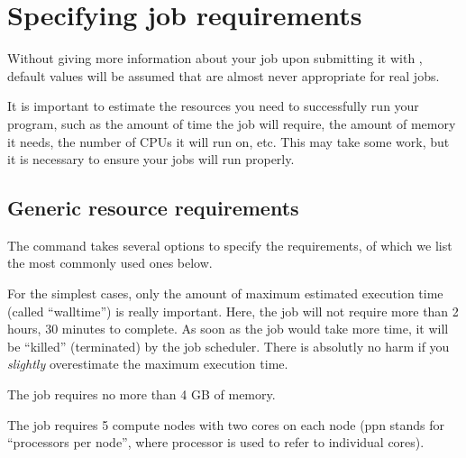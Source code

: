 \section{Specifying job requirements}

Without giving more information about your job upon submitting it with
, default values will be assumed that are almost never appropriate
for real jobs.

It is important to estimate the resources you need to successfully run your
program, such as the amount of time the job will require, the amount of memory
it needs, the number of CPUs it will run on, etc. This may take some work, but
it is necessary to ensure your jobs will run properly.

\subsection{Generic resource requirements}

The  command takes several options to specify the requirements, of which we
list the most commonly used ones below. \\

\begin{prompt}
\end{prompt}

For the simplest cases, only the amount of maximum estimated execution time
(called ``walltime'') is really important. Here, the job will not require more
than 2 hours, 30 minutes to complete. As soon as the job would take more time,
it will be ``killed'' (terminated) by the job scheduler.  There is absolutly no
harm if you \emph{slightly} overestimate the maximum execution time. \\

\begin{prompt}
\end{prompt}

The job requires no more than 4 GB of memory. \\

\begin{prompt}
\end{prompt}

The job requires 5 compute nodes with two cores on each node (ppn stands for
``processors per node'', where processor is used to refer to individual cores). \\

